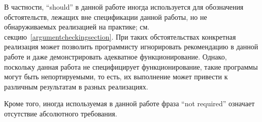 В частности, ``should'' в данной работе иногда используется для обозначения обстоятельств,
лежащих вне спецификации данной работы, но не обнаруживаемых реализацией на практике;
см. секцию~\ref{argumentcheckingsection}. При таких обстоятельствах конкретная реализация может
позволить программисту игнорировать рекомендацию в данной работе и даже демонстрировать
адекватное функционирование. Однако, поскольку данная работа не специфицирует функционирование,
такие программы могут быть непортируемыми, то есть, их выполнение может привести к различным
результатам в разных реализациях.

\newpage

Кроме того, иногда используемая в данной работе фраза ``not required'' означает отсутствие
абсолютного требования.

